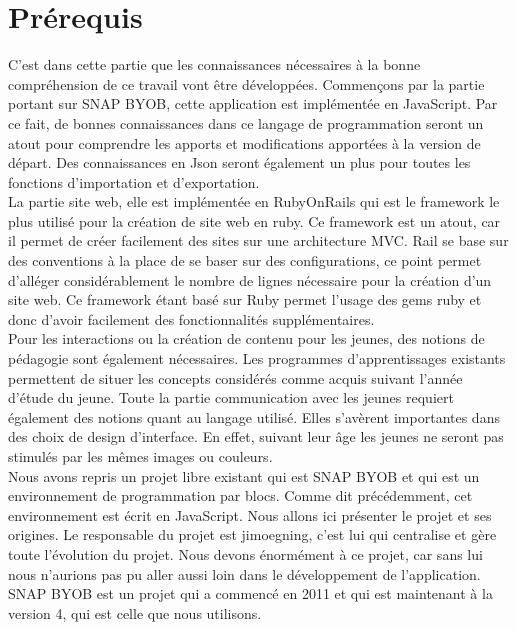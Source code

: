 \section{Prérequis}
C'est dans cette partie que les connaissances nécessaires à la bonne compréhension de ce travail vont être développées. Commençons par la partie portant sur SNAP BYOB, cette application est implémentée en JavaScript. Par ce fait, de bonnes connaissances dans ce langage de programmation seront un atout pour comprendre les apports et modifications apportées à la version de départ. Des connaissances en Json seront également un plus pour toutes les fonctions d'importation et d'exportation.\\

La partie site web, elle est implémentée en RubyOnRails qui est le framework le plus utilisé pour la création de site web en ruby. Ce framework est un atout, car il permet de créer facilement des sites sur une architecture MVC. Rail se base sur des conventions à la place de se baser sur des configurations, ce point permet d'alléger considérablement le nombre de lignes nécessaire pour la création d'un site web. Ce framework étant basé sur Ruby permet l'usage des gems ruby et donc d'avoir facilement des fonctionnalités supplémentaires.\\

Pour les interactions ou la création de contenu pour les jeunes, des notions de pédagogie sont également nécessaires. Les programmes d'apprentissages existants permettent de situer les concepts considérés comme acquis suivant l'année d'étude du jeune. Toute la partie communication avec les jeunes requiert également des notions quant au langage utilisé. Elles s'avèrent importantes dans des choix de design d'interface. En effet, suivant leur âge les jeunes ne seront pas stimulés par les mêmes images ou couleurs.\\

Nous avons repris un projet libre existant qui est SNAP BYOB et qui est un environnement de programmation par blocs. Comme dit précédemment, cet environnement est écrit en JavaScript. Nous allons ici présenter le projet et ses origines. Le responsable du projet est jimoegning, c'est lui qui centralise et gère toute l'évolution du projet. Nous devons énormément à ce projet, car sans lui nous n'aurions pas pu aller aussi loin dans le développement de l'application. SNAP BYOB est un projet qui a commencé en 2011 et qui est maintenant à la version 4, qui est celle que nous utilisons.
